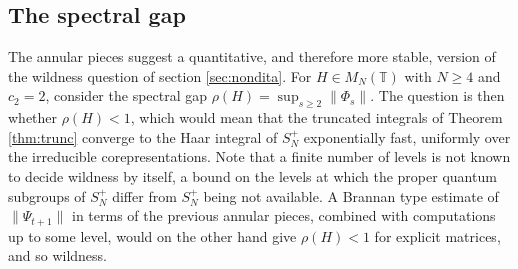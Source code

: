 \documentclass[11pt]{amsart}
\newcommand{\T}{\mathbb T}
\begin{document}
\subsection{The spectral gap}

The annular pieces suggest a quantitative, and therefore more stable, version of the wildness question of section \ref{sec:nondita}. For $H\in M_N(\T)$ with $N\geq4$ and $c_2=2$, consider the spectral gap $\rho(H)=\sup_{s\geq2}\|\Phi_s\|$. The question is then whether $\rho(H)<1$, which would mean that the truncated integrals of Theorem \ref{thm:trunc} converge to the Haar integral of $S_N^+$ exponentially fast, uniformly over the irreducible corepresentations. Note that a finite number of levels is not known to decide wildness by itself, a bound on the levels at which the proper quantum subgroups of $S_N^+$ differ from $S_N^+$ being not available. A Brannan type estimate \cite{bra} of $\|\Psi_{t+1}\|$ in terms of the previous annular pieces, combined with computations up to some level, would on the other hand give $\rho(H)<1$ for explicit matrices, and so wildness.
\end{document}
